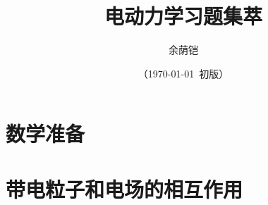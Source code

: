 \documentclass{electrodynamics}
\title{电动力学习题集萃}
\author{余荫铠}
\date{（\today~初版）}
\begin{document}
\maketitle



\setcounter{tocdepth}{0}
\tableofcontents

\setcounter{chapter}{-1}
\chapter{数学准备}
    
    
    
%     
%     
%     
    
%     

%     
%     

%     
%     
%     
%     

%     
%     

%     
%     
%     
%     
%     
    
\chapter{带电粒子和电场的相互作用}
    
    
    

\end{document}
